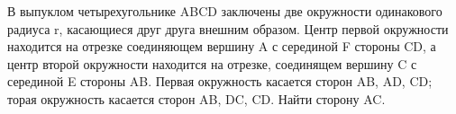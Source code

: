 \documentclass[preview]{standalone}
\begin{document}
В выпуклом четырехугольнике ABCD заключены две окружности одинакового радиуса r, 
                          касающиеся друг друга внешним образом. Центр первой окружности находится на отрезке 
                          соединяющем вершину A с серединой F стороны CD, а центр второй окружности находится 
                          на отрезке, соединящем вершину C с серединой E стороны AB. Первая окружность касается 
                          сторон AB, AD, CD; торая окружность касается сторон AB, DC, CD. Найти сторону AC.
\end{document}
